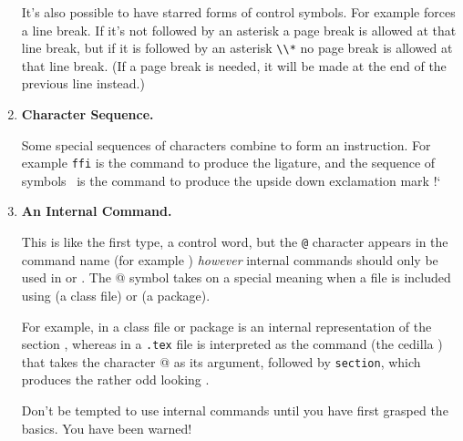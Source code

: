 \begin{enumerate}
It's also possible to have starred forms of control symbols. For
example  forces a line break. If it's
not followed by an asterisk a page break is allowed at that line
break, but if it is followed by an asterisk \verb|\\*| no page break is allowed
at that line break. (If a page break is needed, it will be made at
the end of the previous line instead.)

\item \label{itm:charactersequence}\textbf{Character Sequence.}

Some special sequences of characters combine to form an instruction. For example \texttt{ffi}
is the command to produce the  ligature, and the sequence
of symbols \iexclamdowncmd\ is the command to produce the upside
down exclamation mark !`

\item \textbf{An Internal Command.}

This is like the first type, a control word, but the
\texttt{@}
character appears in the command name (for example
) \emph{however} internal commands should only be
used in  or
. The @ symbol takes on a special
meaning when a file is included using  (a
class file) or  (a package).

For example, in a class file or package  is an
internal representation of the section
, whereas in a \texttt{.tex} file
 is interpreted as the command  (the
cedilla ) that takes the
character @ as its argument, followed by \texttt{section}, which
produces the rather odd looking 
.

Don't be tempted to use internal commands until you have first
grasped the basics. You have been warned!

\end{enumerate}
